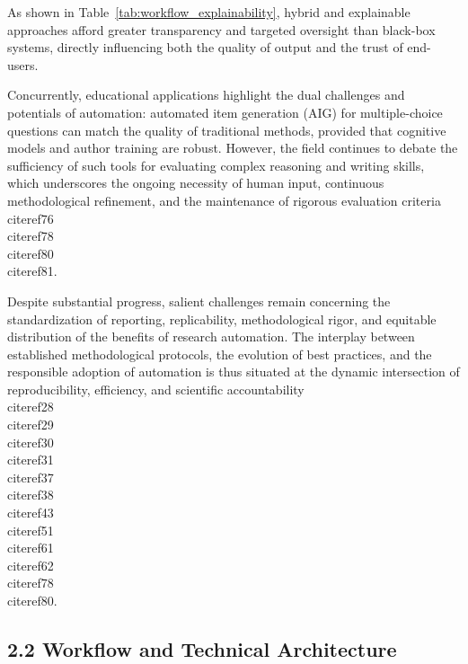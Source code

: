\documentclass[11pt]{article}
\begin{document}
As shown in Table~\ref{tab:workflow_explainability}, hybrid and explainable approaches afford greater transparency and targeted oversight than black-box systems, directly influencing both the quality of output and the trust of end-users.

Concurrently, educational applications highlight the dual challenges and potentials of automation: automated item generation (AIG) for multiple-choice questions can match the quality of traditional methods, provided that cognitive models and author training are robust. However, the field continues to debate the sufficiency of such tools for evaluating complex reasoning and writing skills, which underscores the ongoing necessity of human input, continuous methodological refinement, and the maintenance of rigorous evaluation criteria \\cite{ref76}\\cite{ref78}\\cite{ref80}\\cite{ref81}.

Despite substantial progress, salient challenges remain concerning the standardization of reporting, replicability, methodological rigor, and equitable distribution of the benefits of research automation. The interplay between established methodological protocols, the evolution of best practices, and the responsible adoption of automation is thus situated at the dynamic intersection of reproducibility, efficiency, and scientific accountability \\cite{ref28}\\cite{ref29}\\cite{ref30}\\cite{ref31}\\cite{ref37}\\cite{ref38}\\cite{ref43}\\cite{ref51}\\cite{ref61}\\cite{ref62}\\cite{ref78}\\cite{ref80}.

\subsection{2.2 Workflow and Technical Architecture}
\end{document}
